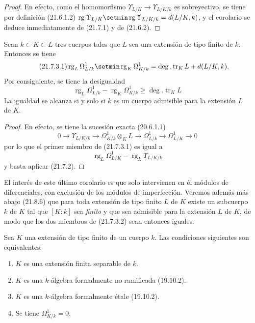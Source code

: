 \begin{proof}
En efecto, como el homomorfismo
$\Upsilon_{L/K}\to\Upsilon_{L/K/k}$ es sobreyectivo, se tiene por definición
(21.6.1.2) $\operatorname{rg}\Upsilon_{L/K}\setmin\operatorname{rg}\Upsilon_{L/K/k}
=d(L/K,k)$, y el corolario se deduce inmediatamente de (21.7.1) y de
(21.6.2).
\end{proof}

\begin{corollary}[21.7.3]
\label{0.21.7.3-fr}
Sean $k\subset K\subset L$ tres cuerpos tales que $L$ sea una extensión de
tipo finito de $k$. Entonces se tiene
\begin{equation}
\tag{21.7.3.1}
\label{0.21.7.3.1-fr}
\operatorname{rg}_L\Omega^1_{L/k}\setmin\operatorname{rg}_K\Omega^1_{K/k}
=\deg.\operatorname{tr}_K L+d(L/K,k).
\end{equation}
Por consiguiente, se tiene la desigualdad
\begin{equation}
\tag{21.7.3.2}
\label{0.21.7.3.2-fr}
\operatorname{rg}_L\Omega^1_{L/k}-\operatorname{rg}_K\Omega^1_{K/k}
\geqslant\deg.\operatorname{tr}_K L
\end{equation}
La igualdad se alcanza si y solo si $k$ es un cuerpo admisible para
la extensión $L$ de $K$.
\end{corollary}

\begin{proof}
En efecto, se tiene la sucesión exacta (20.6.1.1)
\[
0\to\Upsilon_{L/K/k}\to\Omega^1_{K/k}\otimes_KL\to\Omega^1_{L/k}
\to\Omega^1_{L/K}\to0
\]
por lo que el primer miembro de (21.7.3.1) es igual a
\[
\operatorname{rg}_L\Omega^1_{L/K}-\operatorname{rg}_L\Upsilon_{L/K/k}
\]
y basta aplicar (21.7.2).
\end{proof}

El interés de este último corolario es que solo intervienen en él módulos de
diferenciales, con exclusión de los módulos de imperfección. Veremos además más
abajo (21.8.6) que para toda extensión de tipo finito $L$ de $K$ existe un
subcuerpo $k$ de $K$ tal que $[K:k]$ sea \emph{finito} y que sea admisible para la
extensión $L$ de $K$, de modo que los dos miembros de (21.7.3.2) sean entonces
iguales.

\begin{corollary}[21.7.4]
\label{0.21.7.4-fr}
Sea $K$ una extensión de tipo finito de un cuerpo $k$. Las condiciones siguientes
son equivalentes:
\begin{enumerate}
  \item[\rm a)] $K$ es una extensión finita separable de $k$.
  \item[\rm b)] $K$ es una $k$-álgebra formalmente no ramificada \textup{(19.10.2)}.
  \item[\rm c)] $K$ es una $k$-álgebra formalmente étale \textup{(19.10.2)}.
  \item[\rm d)] Se tiene $\Omega^1_{K/k}=0$.
\end{enumerate}
\end{corollary}

